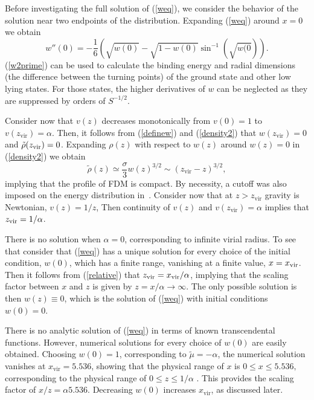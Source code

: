 \documentclass[aps,prl,twocolumn]{revtex4}
\begin{document}
Before investigating the full solution of (\ref{weq}), we consider the behavior of the solution near two endpoints of the distribution.  Expanding (\ref{weq}) around $x=0$ we obtain
\begin{equation}\label{w2prime}
w''(0)=-\frac{1}{6}\left(\sqrt{w(0)}-\sqrt{1-w(0)}\sin^{-1}(\sqrt{w(0})\right).
\end{equation}
(\ref{w2prime}) can be used to calculate the binding energy and radial dimensions (the difference between the turning points) of the ground state and other low lying states. For those states, the higher derivatives of $w$ can be neglected as they are suppressed by orders of $S^{-1/2}$. 

Consider now that $v(z)$ decreases monotonically from $v(0)=1$ to $v(z_\text{vir})=\alpha$. Then, it follows from (\ref{definew}) and (\ref{density2}) that $w(z_\text{vir})=0$ and $\tilde\rho(z_{\rm vir})=0$. Expanding $\rho(z)$ with respect to $w(z)$ around $w(z) = 0$ in (\ref{density2}) we obtain
\begin{equation*}
\tilde\rho(z)\simeq\frac{\sigma}{3}w(z)^{3/2}\sim (z_\text{vir}-z)^{3/2},
\end{equation*}
implying that the profile of FDM is compact. By necessity, a cutoff was also imposed on the energy distribution  in~\cite{Lin}.  Consider now that at $z>z_\text{vir}$ gravity is Newtonian, $v(z)=1/z$, Then  continuity of $v(z)$ and $v(z_\text{vir})=\alpha$ implies that $z_{\rm vir}=1/\alpha$.

There is no solution when $\alpha=0$, corresponding to infinite virial radius.  To see that consider that (\ref{weq}) has a unique solution for every choice of the initial condition, $w(0)$, which has a finite range, vanishing at a finite value, $x=x_{\rm vir}$. Then it follows from (\ref{relative})  that $z_{\rm vir}=x_{\rm vir}/\alpha$, implying that  the scaling factor between $x$ and $z$ is given by $z=x/\alpha\to\infty$. The only possible solution is then $w(z)\equiv0$, which is the solution of (\ref{weq}) with initial conditions $w(0)=0$.


There is no analytic solution of (\ref{weq}) in terms of known transcendental functions.  However, numerical solutions for every choice of $w(0)$ are easily obtained.  Choosing $w(0)=1$, corresponding to $\tilde\mu=-\alpha$, the numerical solution vanishes at  $
x_\text{vir}=5.536$, showing that the physical range of $x$ is $0\leq x\leq 5.536,$  corresponding to the physical range of $0\leq z\leq 1/\alpha$ .  This provides the scaling factor of  $x/z=\alpha  5.536$. Decreasing $w(0)$  increases $
x_\text{vir}$, as discussed later.
\end{document}
